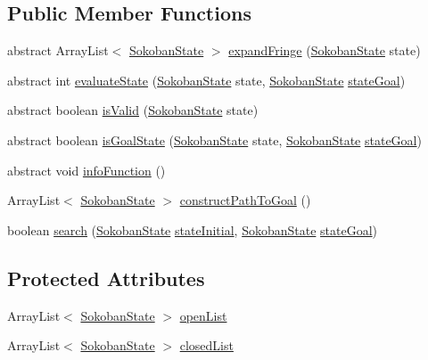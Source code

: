 \subsection*{Public Member Functions}
\begin{CompactItemize}
\item 
abstract ArrayList$<$ \hyperlink{classsokoban_1_1SokobanState}{SokobanState} $>$ \hyperlink{classsokoban_1_1AStarSearch_d898d53b9ed79238fca960bf6f453b7e}{expandFringe} (\hyperlink{classsokoban_1_1SokobanState}{SokobanState} state)
\item 
abstract int \hyperlink{classsokoban_1_1AStarSearch_7f5d111fd7504dc6d47dece202a26b6e}{evaluateState} (\hyperlink{classsokoban_1_1SokobanState}{SokobanState} state, \hyperlink{classsokoban_1_1SokobanState}{SokobanState} \hyperlink{classsokoban_1_1AStarSearch_b79570b0700c83ab7f3ef553923b5c00}{stateGoal})
\item 
abstract boolean \hyperlink{classsokoban_1_1AStarSearch_d41e3201335321840a0d8bac8a66f86f}{isValid} (\hyperlink{classsokoban_1_1SokobanState}{SokobanState} state)
\item 
abstract boolean \hyperlink{classsokoban_1_1AStarSearch_8ac8ea41b08c5f3ba2c41e0b0e53c73f}{isGoalState} (\hyperlink{classsokoban_1_1SokobanState}{SokobanState} state, \hyperlink{classsokoban_1_1SokobanState}{SokobanState} \hyperlink{classsokoban_1_1AStarSearch_b79570b0700c83ab7f3ef553923b5c00}{stateGoal})
\item 
abstract void \hyperlink{classsokoban_1_1AStarSearch_76eb557a34fba75c6b7a5708288cbbe2}{infoFunction} ()
\item 
ArrayList$<$ \hyperlink{classsokoban_1_1SokobanState}{SokobanState} $>$ \hyperlink{classsokoban_1_1AStarSearch_8c634122d21a511f5df4587d005ab8fb}{constructPathToGoal} ()
\item 
boolean \hyperlink{classsokoban_1_1AStarSearch_0e98e5fd53a87168775b34c637eca896}{search} (\hyperlink{classsokoban_1_1SokobanState}{SokobanState} \hyperlink{classsokoban_1_1AStarSearch_901a2b83227c005d77f95879e8059081}{stateInitial}, \hyperlink{classsokoban_1_1SokobanState}{SokobanState} \hyperlink{classsokoban_1_1AStarSearch_b79570b0700c83ab7f3ef553923b5c00}{stateGoal})
\end{CompactItemize}
\subsection*{Protected Attributes}
\begin{CompactItemize}
\item 
ArrayList$<$ \hyperlink{classsokoban_1_1SokobanState}{SokobanState} $>$ \hyperlink{classsokoban_1_1AStarSearch_1f685c2127fec511adaca05855d3c6ae}{openList}
\item 
ArrayList$<$ \hyperlink{classsokoban_1_1SokobanState}{SokobanState} $>$ \hyperlink{classsokoban_1_1AStarSearch_a2d06ef736198f6c282391db3af61317}{closedList}
\end{CompactItemize}
